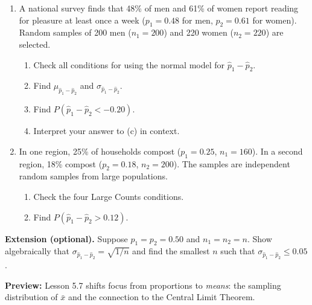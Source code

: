 \documentclass[10pt]{article}
\begin{document}
\namedateperiod

\vspace{0.15in}

\begin{enumerate}

  \item A national survey finds that 48\% of men and 61\% of women report reading for
        pleasure at least once a week ($p_1 = 0.48$ for men, $p_2 = 0.61$ for women).
        Random samples of 200 men ($n_1 = 200$) and 220 women ($n_2 = 220$) are selected.
        \begin{enumerate}[label=\alph*.]
          \item Check all conditions for using the normal model for $\hat{p}_1 - \hat{p}_2$.
          \item Find $\mu_{\hat{p}_1-\hat{p}_2}$ and $\sigma_{\hat{p}_1-\hat{p}_2}$.
                \vspace{0.5in}
          \item Find $P(\hat{p}_1 - \hat{p}_2 < -0.20)$.
                \vspace{0.9in}
          \item Interpret your answer to (c) in context.
        \end{enumerate}

  \item In one region, 25\% of households compost ($p_1 = 0.25$, $n_1 = 160$). In a
        second region, 18\% compost ($p_2 = 0.18$, $n_2 = 200$). The samples are
        independent random samples from large populations.
        \begin{enumerate}[label=\alph*.]
          \item Check the four Large Counts conditions.
                \vspace{0.5in}
          \item Find $P(\hat{p}_1 - \hat{p}_2 > 0.12)$.
                \vspace{0.9in}
        \end{enumerate}

\end{enumerate}

\begin{extensionbox}
\textbf{Extension (optional).}
Suppose $p_1 = p_2 = 0.50$ and $n_1 = n_2 = n$. Show algebraically that
$\sigma_{\hat{p}_1-\hat{p}_2} = \sqrt{1/n}$ and find the smallest $n$ such that
$\sigma_{\hat{p}_1-\hat{p}_2} \le 0.05$.
\end{extensionbox}

\begin{reflectionbox}
\textbf{Preview:} Lesson 5.7 shifts focus from proportions to \emph{means}: the sampling
distribution of $\bar{x}$ and the connection to the Central Limit Theorem.
\end{reflectionbox}
\end{document}
